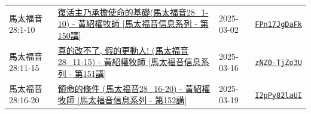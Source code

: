 \documentclass{book}
\begin{document}
{\begin{xltabular}{\textwidth}{|p{0.15\textwidth} p{0.6\textwidth}|p{0.07\textwidth} p{0.1\textwidth}|}
馬太福音 28:1-10 & \hyperref[sec:FPn17JgDaFk]{復活主乃承擔使命的基礎(馬太福音28\_1-10) - 黃紹權牧師  [馬太福音信息系列 - 第150講]} & 2025-03-02 & \href{https://youtube.com/watch?v=FPn17JgDaFk}{\texttt{FPn17JgDaFk}} \\
馬太福音 28:11-15 & \hyperref[sec:zNZ0_TjZo3U]{真的改不了, 假的更動人! (馬太福音28\_11-15) - 黃紹權牧師  [馬太福音信息系列 - 第151講]} & 2025-03-16 & \href{https://youtube.com/watch?v=zNZ0-TjZo3U}{\texttt{zNZ0-TjZo3U}} \\
馬太福音 28:16-20 & \hyperref[sec:I2pPy82laUI]{領命的條件 (馬太福音28\_16-20) - 黃紹權牧師  [馬太福音信息系列 - 第152講]} & 2025-03-19 & \href{https://youtube.com/watch?v=I2pPy82laUI}{\texttt{I2pPy82laUI}} \\
\hline
\end{xltabular}
}
\newpage
\end{document}
